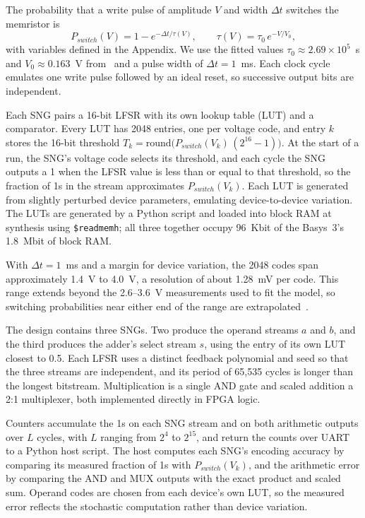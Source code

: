 \documentclass[conference]{IEEEtran}
\begin{document}
The probability that a write pulse of amplitude $V$ and width $\Delta t$
switches the memristor is
\begin{equation}
  P_{switch}(V) = 1 - e^{-\Delta t/\tau(V)}, \qquad
  \tau(V) = \tau_0\, e^{-V/V_0},
  \label{eq:pswitch}
\end{equation}
with variables defined in the Appendix. We use the fitted values
$\tau_0 \approx 2.69\times10^{5}$~s and $V_0 \approx 0.163$~V
from~\cite{memristor_stochasticity} and a pulse width of $\Delta t = 1$~ms.
Each clock cycle emulates one write pulse followed by an ideal reset, so
successive output bits are independent.

Each SNG pairs a 16-bit LFSR with its own lookup table (LUT) and a
comparator. Every LUT has 2048 entries, one per voltage code, and entry $k$
stores the 16-bit threshold
$T_k = \mathrm{round}\big(P_{switch}(V_k)\,(2^{16}-1)\big)$. At the start of
a run, the SNG's voltage code selects its threshold, and each cycle the SNG
outputs a 1 when the LFSR value is less than or equal to that threshold, so
the fraction of 1s in the stream approximates $P_{switch}(V_k)$. Each LUT is
generated from slightly perturbed device parameters, emulating
device-to-device variation. The LUTs are generated by a Python script and loaded 
into block RAM at synthesis using \texttt{\$readmemh}; all three together occupy 
96~Kbit of the Basys~3's 1.8~Mbit of block RAM.

With $\Delta t = 1$~ms and a margin for device variation, the 2048 codes span
approximately 1.4~V to 4.0~V, a resolution of about 1.28~mV per code. This
range extends beyond the 2.6--3.6~V measurements used to fit the model, so
switching probabilities near either end of the range are
extrapolated~\cite{memristor_stochasticity}.

The design contains three SNGs. Two produce the operand streams $a$ and $b$,
and the third produces the adder's select stream $s$, using the entry of its
own LUT closest to 0.5. Each LFSR uses a distinct feedback polynomial and
seed so that the three streams are independent, and its period of 65,535 cycles is longer than the longest
bitstream. Multiplication is a single AND gate and scaled addition a 2:1
multiplexer, both implemented directly in FPGA logic.

Counters accumulate the 1s on each SNG stream and on both arithmetic outputs
over $L$ cycles, with $L$ ranging from $2^{4}$ to $2^{15}$, and return the
counts over UART to a Python host script. The host computes each SNG's
encoding accuracy by comparing its measured fraction of 1s with
$P_{switch}(V_k)$, and the arithmetic error by comparing the AND and MUX
outputs with the exact product and scaled sum. 
Operand codes are chosen from each device's own LUT, so the measured error 
reflects the stochastic computation rather than device variation.
\end{document}
